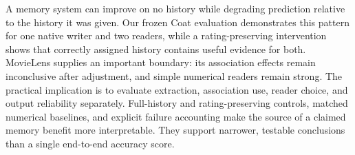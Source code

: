 A memory system can improve on no history while degrading prediction relative to the history it was given. Our frozen Coat evaluation demonstrates this pattern for one native writer and two readers, while a rating-preserving intervention shows that correctly assigned history contains useful evidence for both. MovieLens supplies an important boundary: its association effects remain inconclusive after adjustment, and simple numerical readers remain strong. The practical implication is to evaluate extraction, association use, reader choice, and output reliability separately. Full-history and rating-preserving controls, matched numerical baselines, and explicit failure accounting make the source of a claimed memory benefit more interpretable. They support narrower, testable conclusions than a single end-to-end accuracy score.
